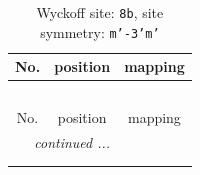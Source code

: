 \documentclass[fleqn,8pt]{jsarticle}
\begin{document}
\renewcommand{\arraystretch}{1.2}
\begin{longtable}{ccc}
\caption{Wyckoff site: {\tt 8b}, site symmetry: {\tt m'-3'm'}}
 \\
 \hline \hline
No. & position & mapping \\ \hline \endfirsthead

\multicolumn{2}{l}{\tablename\ \thetable{}} \\
 \hline \hline
No. & position & mapping \\ \hline \endhead

 \hline \hline
\multicolumn{2}{r}{\footnotesize\it continued ...} \\ \endfoot

 \hline \hline
\multicolumn{2}{r}{} \\ \endlastfoot


\end{longtable}
\end{document}
